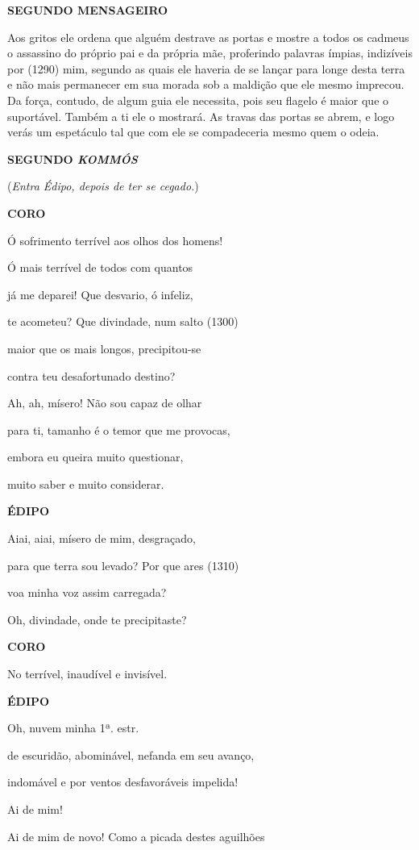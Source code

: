 \textbf{SEGUNDO MENSAGEIRO}

Aos gritos ele ordena que alguém destrave as portas e mostre a todos os
cadmeus o assassino do próprio pai e da própria mãe, proferindo palavras
ímpias, indizíveis por (1290) mim, segundo as quais ele haveria de se
lançar para longe desta terra e não mais permanecer em sua morada sob a
maldição que ele mesmo imprecou. Da força, contudo, de algum guia ele
necessita, pois seu flagelo é maior que o suportável. Também a ti ele o
mostrará. As travas das portas se abrem, e logo verás um espetáculo tal
que com ele se compadeceria mesmo quem o odeia.

\textbf{SEGUNDO \emph{KOMMÓS}}

(\emph{Entra Édipo, depois de ter se cegado.})

\textbf{CORO}

Ó sofrimento terrível aos olhos dos homens!

Ó mais terrível de todos com quantos

já me deparei! Que desvario, ó infeliz,

te acometeu? Que divindade, num salto (1300)

maior que os mais longos, precipitou-se

contra teu desafortunado destino?

Ah, ah, mísero! Não sou capaz de olhar

para ti, tamanho é o temor que me provocas,

embora eu queira muito questionar,

muito saber e muito considerar.

\textbf{ÉDIPO}

Aiai, aiai, mísero de mim, desgraçado,

para que terra sou levado? Por que ares (1310)

voa minha voz assim carregada?

Oh, divindade, onde te precipitaste?

\textbf{CORO}

No terrível, inaudível e invisível.

\textbf{ÉDIPO}

Oh, nuvem minha 1ª. estr.

de escuridão, abominável, nefanda em seu avanço,

indomável e por ventos desfavoráveis impelida!

Ai de mim!

Ai de mim de novo! Como a picada destes aguilhões

